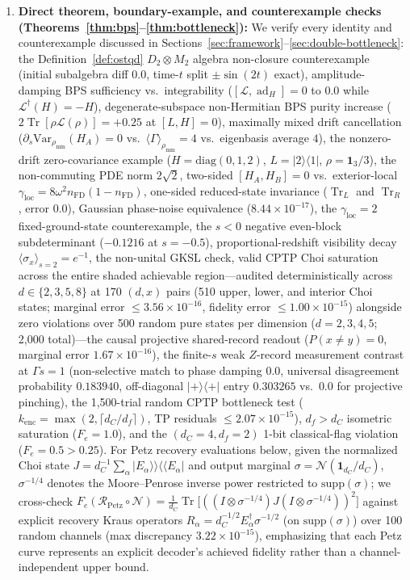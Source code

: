 \documentclass[11pt,a4paper]{article}
\theoremstyle{definition}
\theoremstyle{remark}
\newcommand{\Tr}{\operatorname{Tr}}
\newcommand{\ad}{\operatorname{ad}}
\newcommand{\cL}{\mathcal{L}}
\newcommand{\cR}{\mathcal{R}}
\newcommand{\1}{\mathbf{1}}
\begin{document}
\begin{enumerate}
  \item \textbf{Direct theorem, boundary-example, and counterexample checks (Theorems~\ref{thm:bps}--\ref{thm:bottleneck}):}
  We verify every identity and counterexample discussed in Sections~\ref{sec:framework}--\ref{sec:double-bottleneck}: the Definition~\ref{def:ostqd} $D_2\otimes M_2$ algebra non-closure counterexample (initial subalgebra diff $0.0$, time-$t$ split $\pm\sin(2t)$ exact), amplitude-damping BPS sufficiency vs.\ integrability ($[\cL,\ad_H]=0$ to $0.0$ while $\cL^\dagger(H)=-H$), degenerate-subspace non-Hermitian BPS purity increase ($2\Tr[\rho\cL(\rho)]=+0.25$ at $[L,H]=0$), maximally mixed drift cancellation ($\partial_s\mathrm{Var}_{\rho_{\mathrm{mm}}}(H_A)=0$ vs.\ $\langle\Gamma\rangle_{\rho_{\mathrm{mm}}}=4$ vs.\ eigenbasis average $4$), the nonzero-drift zero-covariance example ($H=\mathrm{diag}(0,1,2)$, $L=|2\rangle\langle 1|$, $\rho=\1_3/3$), the non-commuting PDE norm $2\sqrt{2}$, two-sided $[H_A,H_B]=0$ vs.\ exterior-local $\gamma_{\mathrm{loc}} = 8\omega^2 n_{\mathrm{FD}}(1-n_{\mathrm{FD}})$, one-sided reduced-state invariance ($\Tr_L$ and $\Tr_R$, error $0.0$), Gaussian phase-noise equivalence ($8.44\times 10^{-17}$), the $\gamma_{\mathrm{loc}}=2$ fixed-ground-state counterexample, the $s<0$ negative even-block subdeterminant ($-0.1216$ at $s=-0.5$), proportional-redshift visibility decay $\langle\sigma_x\rangle_{s=2}=e^{-1}$, the non-unital GKSL check, valid CPTP Choi saturation across the entire shaded achievable region---audited deterministically across $d\in\{2,3,5,8\}$ at 170 $(d,x)$ pairs (510 upper, lower, and interior Choi states; marginal error $\le 3.56\times 10^{-16}$, fidelity error $\le 1.00\times 10^{-15}$) alongside zero violations over 500 random pure states per dimension ($d=2,3,4,5$; 2,000 total)---the causal projective shared-record readout ($P(x\neq y)=0$, marginal error $1.67\times 10^{-16}$), the finite-$s$ weak $Z$-record measurement contrast at $\Gamma s = 1$ (non-selective match to phase damping $0.0$, universal disagreement probability $0.183940$, off-diagonal $|+\rangle\langle +|$ entry $0.303265$ vs.\ $0.0$ for projective pinching), the 1,500-trial random CPTP bottleneck test ($k_{\mathrm{enc}} = \max(2, \lceil d_C/d_f\rceil)$, TP residuals $\le 2.07\times 10^{-15}$), $d_f>d_C$ isometric saturation ($F_e=1.0$), and the $(d_C=4,d_f=2)$ 1-bit classical-flag violation ($F_e=0.5 > 0.25$).
  For Petz recovery evaluations below, given the normalized Choi state $J = d_C^{-1}\sum_\alpha |E_\alpha\rangle\!\rangle\langle\!\langle E_\alpha|$ and output marginal $\sigma = \mathcal{N}(\1_{d_C}/d_C)$, $\sigma^{-1/4}$ denotes the Moore--Penrose inverse power restricted to $\mathrm{supp}(\sigma)$; we cross-check $F_e(\cR_{\mathrm{Petz}}\circ\mathcal{N}) = \frac{1}{d_C}\Tr\bigl[((I\otimes\sigma^{-1/4})J(I\otimes\sigma^{-1/4}))^2\bigr]$ against explicit recovery Kraus operators $R_\alpha = d_C^{-1/2}E_\alpha^\dagger\sigma^{-1/2}$ (on $\mathrm{supp}(\sigma)$) over 100 random channels (max discrepancy $3.22\times 10^{-15}$), emphasizing that each Petz curve represents an explicit decoder's achieved fidelity rather than a channel-independent upper bound.


\end{enumerate}
\end{document}
